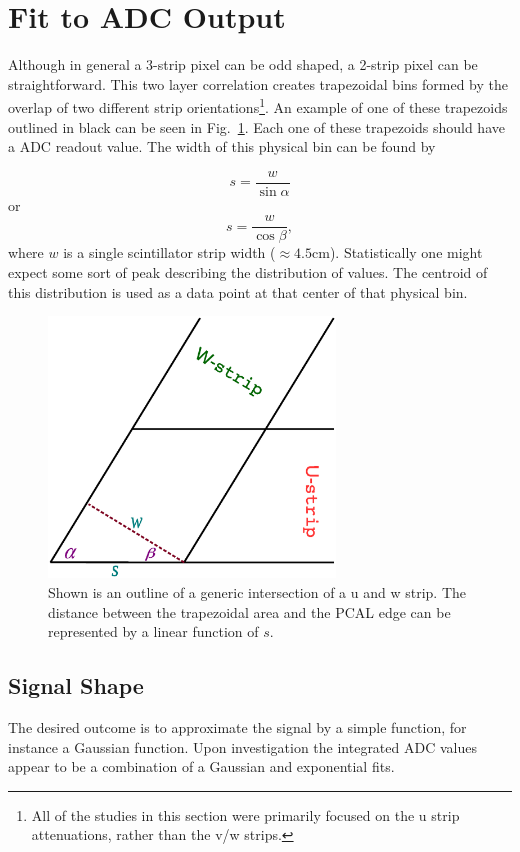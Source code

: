 \section{Fit to ADC Output}
\label{Sec:fitToADCOutput}
Although in general a 3-strip pixel can be odd shaped, a 2-strip pixel can be straightforward. 
This two layer correlation creates trapezoidal bins formed by the overlap of two different strip 
orientations\footnote{All of the studies in this section were primarily focused on the u strip attenuations, 
rather than the v/w strips.}. An example of one of these trapezoids outlined in black can be seen in Fig.~\ref{fig:stripwidth}. 
Each one of these trapezoids should have a ADC readout value. The width of this physical bin can be found by

\begin{equation}
    s = \frac{w}{\sin{\alpha}}
    \label{eq:s}
\end{equation}
or
\begin{equation}
    s = \frac{w}{\cos{\beta}},
\end{equation}
where $w$ is a single scintillator strip width ($\approx 4.5$cm).
Statistically one might expect some sort of peak describing the distribution of values. The centroid of this 
distribution is used as a data point at that center of that physical bin.

\begin{figure}[h]
\centering
\includegraphics[width= 3in, keepaspectratio = true]{trapezoidUWintersection}%
\caption{Shown is an outline of a generic intersection of a u and w strip. The distance between the trapezoidal
 area and the PCAL edge can be represented by a linear function of $s$.}
\label{fig:stripwidth}
\end{figure}

\FloatBarrier
\subsection{Signal Shape}
The desired outcome is to approximate the signal by a simple function, for instance a Gaussian function.
Upon investigation the integrated ADC values appear to be a combination of a Gaussian and exponential fits.

